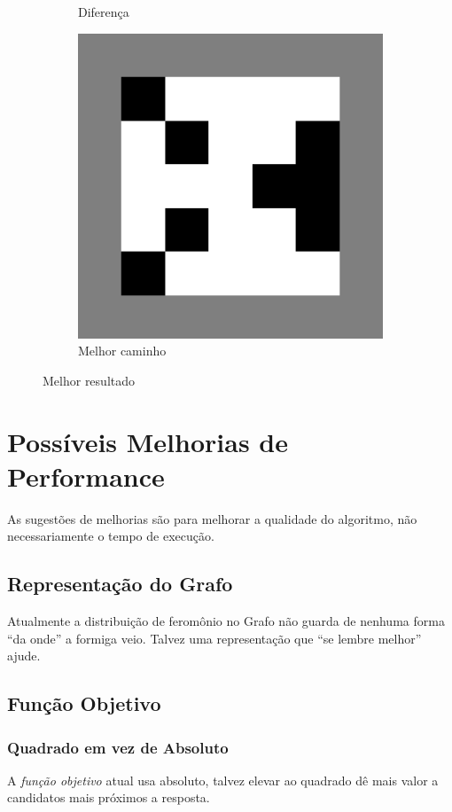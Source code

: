 \documentclass{article}
\begin{document}
\begin{figure}
\begin{subfigure}{0.3\textwidth}
        \caption{Diferença}
    \end{subfigure}
    \begin{subfigure}{0.3\textwidth}
        \centering
        \includegraphics[width=0.9\linewidth]{face/evap005-it100/run1-border}
        \caption{Melhor caminho}
    \end{subfigure}
    \caption{Melhor resultado}
\end{figure}

\section{Possíveis Melhorias de Performance}

As sugestões de melhorias são para melhorar
a qualidade do algoritmo,
não necessariamente o tempo de execução.

\subsection{Representação do Grafo}
Atualmente a distribuição de feromônio no Grafo
não guarda de nenhuma forma ``da onde'' a formiga veio.
Talvez uma representação que ``se lembre melhor'' ajude.

\subsection{Função Objetivo}
\subsubsection{Quadrado em vez de Absoluto}
A \emph{função objetivo} atual usa absoluto,
talvez elevar ao quadrado dê mais valor
a candidatos mais próximos a resposta.
\end{document}
